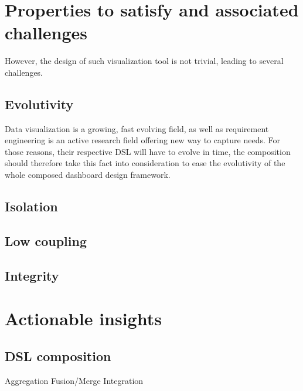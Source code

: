 \documentclass{acm_proc_article-sp}
\begin{document}
\section{Properties to satisfy and associated challenges}
However, the design of such visualization tool is not trivial, leading to several challenges.

\subsection{Evolutivity}
Data visualization is a growing, fast evolving field, as well as requirement
engineering is an active research field offering new way to capture needs.
For those reasons, their respective DSL will have to evolve in time, the
composition should therefore take this fact into consideration to ease the
evolutivity of the whole composed dashboard design framework.

\subsection{Isolation}
\subsection{Low coupling}
\subsection{Integrity}

\section{Actionable insights}
\subsection{DSL composition}
		Aggregation
		Fusion/Merge
		Integration





%

%
\end{document}
